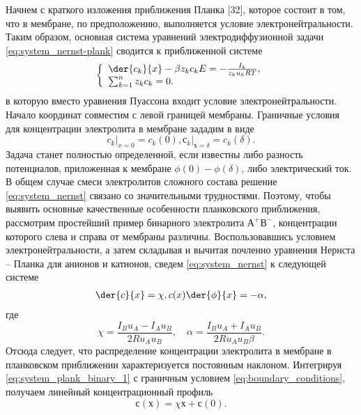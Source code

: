 Начнем с краткого изложения приближения Планка [32], которое состоит в том, что
в мембране, по предположению, выполняется условие электронейтральности. Таким
образом, основная система уравнений электродиффузионной задачи
\eqref{eq:system_nernst-plank} сводится к приближенной системе
\begin{equation}
\left\{
    \begin{array}{l}
        \der{c_k}{x} - \beta z_k c_k E = - \frac{I_k}{z_k u_k RT},\\
        \sum_{k=1}^n z_k c_k = 0.
    \end{array}
\right.
\label{eq:system_nernst}
\end{equation}
в которую вместо уравнения Пуассона входит условие электронейтральности. Начало
координат совместим с левой границей мембраны. Граничные условия для
концентрации электролита в мембране зададим в виде
\begin{equation}
    \left.c_k\right|_{x=0} = c_k(0), \left.с_k\right|_{х=\delta} = c_k(\delta).
    \label{eq:boundary_conditions}
\end{equation}
Задача станет полностью определенной, если известны либо разность потенциалов,
приложенная к мембране \( \phi(0) - \phi(\delta) \), либо электрический ток.
В общем случае смеси электролитов сложного состава решение
\eqref{eq:system_nernst} связано со значительными трудностями. Поэтому, чтобы
выявить основные качественные особенности планковского приближения, рассмотрим
простейший пример бинарного электролита \( А^+В^- \), концентрации которого
слева и справа от мембраны различны. Воспользовавшись условием
электронейтральности, а затем складывая и вычитая почленно уравнения
Нернста -- Планка для анионов и катионов, сведем \eqref{eq:system_nernst} к
следующей системе
\begin{align}
    \der{c}{x} = \chi,              \label{eq:system_plank_binary_1}
    c(x)\der{\phi}{x} = -\alpha,    \label{eq:system_plank_binary_2}
\end{align}
где
\begin{equation}
    \chi = \frac{I_B u_A - I_A u_B}{2Ru_Au_B},\quad
    \alpha = \frac{I_B u_A + I_A u_B}{2Ru_Au_B\beta}.
    \label{eq:system_plank_binary_subs}
\end{equation}
Отсюда следует, что распределение концентрации электролита в мембране в
планковском приближении характеризуется постоянным наклоном. Интегрируя
\eqref{eq:system_plank_binary_1} с граничным условием
\eqref{eq:boundary_conditions}, получаем линейный концентрационный профиль
\begin{equation}
    с (х) = \chi х + с(0).
    \label{eq:plank_binary_conc}
\end{equation}
